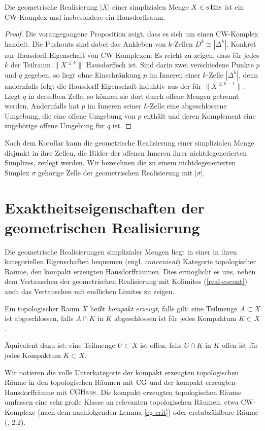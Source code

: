 \begin{kor} \label{real-hd}
  Die geometrische Realisierung $|X|$ einer simplizialen Menge $X \in
  \operatorname{s}\operatorname{Ens}$ ist ein CW-Komplex und insbesondere ein Hausdorffraum.
\end{kor}
\begin{proof}
  Die vorangegangene Proposition zeigt, dass es sich um einen
  CW-Komplex handelt. Die Pushouts sind dabei das Ankleben von
  $k$-Zellen $D^k \cong |\Delta^k|$. Konkret zur Hausdorff-Eigenschaft
  von CW-Komplexen: Es reicht zu zeigen, dass für jedes $k$ der
  Teilraum $\|X^{\leq k}\|$ Hausdorffsch ist. Sind darin zwei
  verschiedene Punkte $p$ und $q$ gegeben, so liegt ohne Einschränkung
  $p$ im Inneren einer $k$-Zelle $|\Delta^k|$, denn andernfalls folgt
  die Hausdorff-Eigenschaft induktiv aus der für $\|X^{\leq
    k-1}\|$. Liegt $q$ in derselben Zelle, so können sie dort durch
  offene Mengen getrennt werden. Andernfalls hat $p$ im Inneren seiner
  $k$-Zelle eine abgeschlossene Umgebung, die eine offene Umgebung von
  $p$ enthält und deren Komplement eine zugehörige offene Umgebung für
  $q$ ist.
\end{proof}
\begin{bem} \label{cw-cells}
  Nach dem Korollar kann die geometrische Realisierung einer
  simplizialen Menge disjunkt in ihre Zellen, die Bilder der offenen
  Inneren ihrer nichtdegenerierten Simplizes, zerlegt werden. Wir
  bezeichnen die zu einem nichtdegenerierten Simplex $\sigma$ gehörige
  Zelle der geometrischen Realisierung mit $|\sigma|$.
\end{bem}

\section{Exaktheitseigenschaften der geometrischen Realisierung}

Die geometrische Realisierungen simplizialer Mengen liegt in einer in
ihren kategoriellen Eigenschaften bequemen (engl. \emph{convenient})
Kategorie topologischer Räume, den kompakt erzeugten
Hausdorffräumen. Dies ermöglicht es uns, neben dem Vertauschen der
geometrischen Realisierung mit Kolimites (\ref{real-cocont}) auch das
Vertauschen mit endlichen Limites zu zeigen.

\begin{defn} \label{def:cg}
  Ein topologischer Raum $X$ heißt \emph{kompakt erzeugt}, falls gilt:
  eine Teilmenge $A \subset X$ ist abgeschlossen, falls $A \cap K$ in
  $K$ abgeschlossen ist für jedes Kompaktum $K \subset X$.
\end{defn}
\begin{bem}
  Äquivalent dazu ist: eine Teilmenge $U \subset X$ ist offen, falls
  $U \cap K$ in $K$ offen ist für jedes Kompaktum $K \subset X$.
\end{bem}
Wir notieren die volle Unterkategorie der kompakt erzeugten
topologischen Räume in den topologischen Räumen mit $\operatorname{CG}$ und der
kompakt erzeugten Hausdorffräume mit $\operatorname{CGHaus}$. Die kompakt erzeugten
topologischen Räume umfassen eine sehr große Klasse an relevanten
topologischen Räumen, etwa CW-Komplexe (nach dem nachfolgenden Lemma
\ref{cg-crit}) oder erstabzählbare Räume (\cite{Steenrod}, 2.2).

